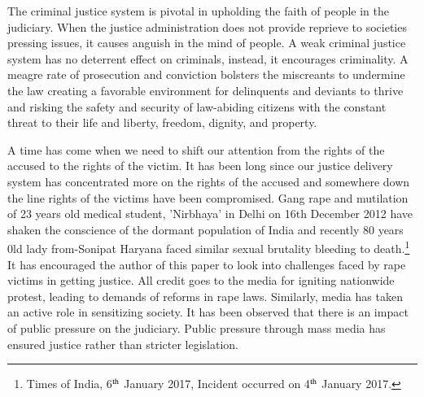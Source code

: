 \setcounter{figure}{0}
\setcounter{table}{0}

\label{2016-art1}

\begin{multicols}{2}


\noi
The criminal justice system is pivotal in upholding the faith of people in the judiciary.
When the justice administration does not provide reprieve to societies pressing issues,
it causes anguish in the mind of people. A weak criminal justice system has no deterrent
effect on criminals, instead, it encourages criminality. A meagre rate of prosecution and
conviction bolsters the miscreants to undermine the law creating a favorable
environment for delinquents and deviants to thrive and risking the safety and security
of law-abiding citizens with the constant threat to their life and liberty, freedom,
dignity, and property.

\noi
A time has come when we need to shift our attention from the rights of the accused to
the rights of the victim. It has been long since our justice delivery system has
concentrated more on the rights of the accused and somewhere down the line rights of
the victims have been compromised. Gang rape and mutilation of 23 years old medical
student, 'Nirbhaya' in Delhi on 16th December 2012 have shaken the conscience of the
dormant population of India and recently 80 years 0ld lady from-Sonipat Haryana faced
similar sexual brutality bleeding to death.\footnote{Times of India, 6$^{\rm th}$ January 2017, Incident occurred on 4$^{\rm th}$ January 2017.}
It has encouraged the author of this paper to
look into challenges faced by rape victims in getting justice. All credit goes to the media
for igniting nationwide protest, leading to demands of reforms in rape laws. Similarly,
media has taken an active role in sensitizing society. It has been observed that there is
an impact of public pressure on the judiciary. Public pressure through mass media has
ensured justice rather than stricter legislation.



\end{multicols}
